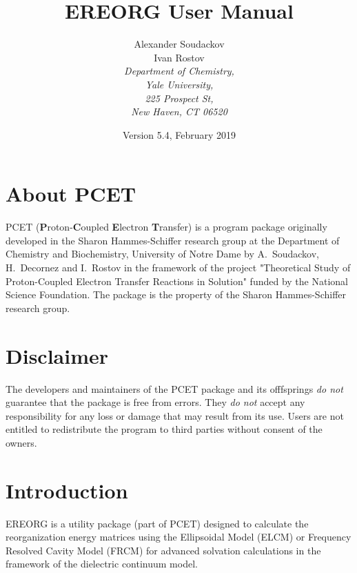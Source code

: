 \documentclass[oneside,11pt,openany]{book}
\begin{document}
%
\title{EREORG User Manual}
%
\author{Alexander Soudackov\\
Ivan Rostov\\
%
\it{\small Department of Chemistry,}\\
\it{\small Yale University,}\\
\it{\small 225 Prospect St,}\\
\it{\small New Haven, CT 06520}}
%
\date{Version 5.4, February 2019}

\maketitle
\frontmatter
\chapter*{About PCET}
PCET ({\bf P}roton-{\bf C}oupled {\bf E}lectron {\bf T}ransfer)
is a program package originally developed in the Sharon Hammes-Schiffer
research group at the Department of Chemistry and Biochemistry,
University of Notre Dame by A.~Soudackov, H.~Decornez and I.~Rostov in
the framework of the project "Theoretical Study of Proton-Coupled
Electron Transfer Reactions in Solution" funded by the National Science
Foundation. The package is the property of the Sharon Hammes-Schiffer
research group.

\chapter*{Disclaimer}
The developers and maintainers of the PCET package and its offfsprings
{\em do not} guarantee that the package is free from errors. They
{\em do not} accept any responsibility for any loss or damage that
may result from its use. Users are not entitled to redistribute the
program to third parties without consent of the owners.

\tableofcontents

\mainmatter

\chapter{Introduction}
EREORG is a utility package (part of PCET) designed to calculate the
reorganization energy matrices using the Ellipsoidal Model (ELCM) or
Frequency Resolved Cavity Model (FRCM) for advanced solvation calculations
in the framework of the dielectric continuum model.
\end{document}
